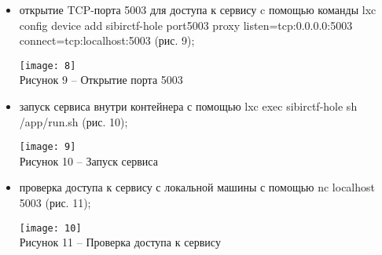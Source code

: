 \begin{itemize}
\item открытие TCP-порта 5003 для доступа к сервису c помощью команды lxc config device add sibirctf-hole port5003 proxy listen=tcp:0.0.0.0:5003 connect=tcp:localhost:5003 (рис. 9);
\begin{center}
\texttt{[image: 8]}\\
Рисунок 9 -- Открытие порта 5003\\
\end{center}
\vspace{\baselineskip}

\item запуск сервиса внутри контейнера с помощью lxc exec sibirctf-hole sh /app/run.sh (рис. 10);
\begin{center}
\texttt{[image: 9]}\\
Рисунок 10 -- Запуск сервиса\\
\end{center}
\vspace{\baselineskip}

\item проверка доступа к сервису с локальной машины с помощью nc localhost 5003 (рис. 11);
\begin{center}
\texttt{[image: 10]}\\
Рисунок 11 -- Проверка доступа к сервису\\
\end{center}

\end{itemize}
\vspace{\baselineskip}

